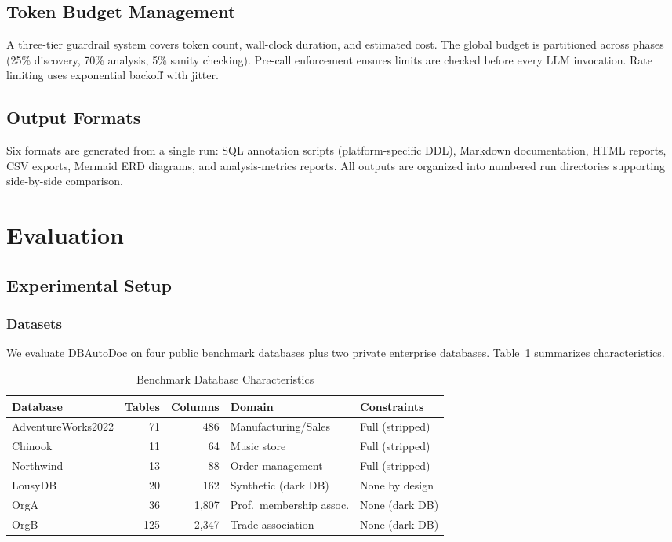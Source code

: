 \documentclass[twocolumn]{svjour3}
\begin{document}
\subsection{Token Budget Management}

A three-tier guardrail system covers token count, wall-clock duration, and estimated cost. The global budget is partitioned across phases (25\% discovery, 70\% analysis, 5\% sanity checking). Pre-call enforcement ensures limits are checked before every LLM invocation. Rate limiting uses exponential backoff with jitter.

\subsection{Output Formats}

Six formats are generated from a single run: SQL annotation scripts (platform-specific DDL), Markdown documentation, HTML reports, CSV exports, Mermaid ERD diagrams, and analysis-metrics reports. All outputs are organized into numbered run directories supporting side-by-side comparison.


\section{Evaluation}\label{sec:evaluation}

\subsection{Experimental Setup}

\subsubsection{Datasets}

We evaluate DBAutoDoc on four public benchmark databases plus two private enterprise databases. Table~\ref{tab:benchmarks} summarizes characteristics.

\begin{table}[htbp]
\caption{Benchmark Database Characteristics}
\label{tab:benchmarks}
\centering
\begin{tabular}{lrrll}
\toprule
\textbf{Database} & \textbf{Tables} & \textbf{Columns} & \textbf{Domain} & \textbf{Constraints} \\
\midrule
AdventureWorks2022 & 71 & 486 & Manufacturing/Sales & Full (stripped) \\
Chinook & 11 & 64 & Music store & Full (stripped) \\
Northwind & 13 & 88 & Order management & Full (stripped) \\
LousyDB & 20 & 162 & Synthetic (dark DB) & None by design \\
OrgA & 36 & 1{,}807 & Prof.\ membership assoc. & None (dark DB) \\
OrgB & 125 & 2{,}347 & Trade association & None (dark DB) \\
\bottomrule
\end{tabular}
\end{table}
\end{document}

